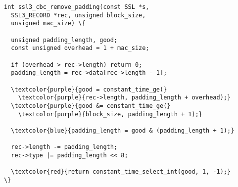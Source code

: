 \begin{minipage}[t]{3.1in}
\small
\begin{Verbatim}
int ssl3_cbc_remove_padding(const SSL *s, 
  SSL3_RECORD *rec, unsigned block_size, 
  unsigned mac_size) \{
 
  unsigned padding_length, good;
  const unsigned overhead = 1 + mac_size;

  if (overhead > rec->length) return 0;
  padding_length = rec->data[rec->length - 1];

  \textcolor{purple}{good = constant_time_ge(}
    \textcolor{purple}{rec->length, padding_length + overhead);}
  \textcolor{purple}{good &= constant_time_ge(}
    \textcolor{purple}{block_size, padding_length + 1);}
    
  \textcolor{blue}{padding_length = good & (padding_length + 1);}
  
  rec->length -= padding_length;
  rec->type |= padding_length << 8;
  
  \textcolor{red}{return constant_time_select_int(good, 1, -1);}
\}
\end{Verbatim}
\end{minipage}